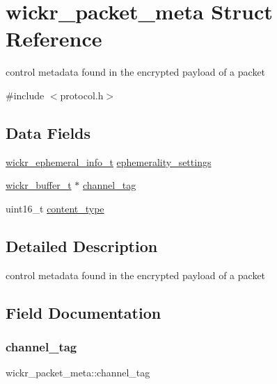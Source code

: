 \hypertarget{structwickr__packet__meta}{}\section{wickr\+\_\+packet\+\_\+meta Struct Reference}
\label{structwickr__packet__meta}


control metadata found in the encrypted payload of a packet  




{\ttfamily \#include $<$protocol.\+h$>$}

\subsection*{Data Fields}
\begin{DoxyCompactItemize}
\item 
\hyperlink{structwickr__ephemeral__info}{wickr\+\_\+ephemeral\+\_\+info\+\_\+t} \hyperlink{structwickr__packet__meta_a0ef43c179038ba036fc9db17976b8b1e}{ephemerality\+\_\+settings}
\item 
\hyperlink{structwickr__buffer}{wickr\+\_\+buffer\+\_\+t} $\ast$ \hyperlink{structwickr__packet__meta_ab160a2ecfc6146ddf2ce40fe301c8ce9}{channel\+\_\+tag}
\item 
uint16\+\_\+t \hyperlink{structwickr__packet__meta_ada659f7c31d257c76edab5db52973f6e}{content\+\_\+type}
\end{DoxyCompactItemize}


\subsection{Detailed Description}
control metadata found in the encrypted payload of a packet 

\subsection{Field Documentation}
\mbox{\label{structwickr__packet__meta_ab160a2ecfc6146ddf2ce40fe301c8ce9}} 
\subsubsection{\texorpdfstring{channel\+\_\+tag}{channel\_tag}}
{\footnotesize\ttfamily wickr\+\_\+packet\+\_\+meta\+::channel\+\_\+tag}

